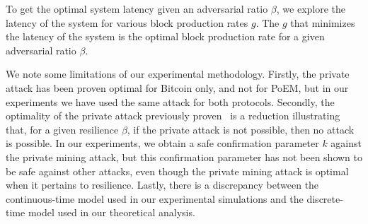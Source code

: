 To get the optimal system latency given an adversarial ratio $\beta$, we explore the latency of the system for various block production rates $g$.
The $g$ that minimizes the latency of the system is the optimal block production rate for a given adversarial ratio $\beta$.




%
%

We note some limitations of our experimental methodology. Firstly, the private attack has been proven optimal
for Bitcoin only, and not for PoEM, but in our experiments we have used the same attack for both protocols.
Secondly, the optimality of the private attack previously proven~\cite{eiar} is a reduction illustrating
that, for a given resilience $\beta$, if the private attack is not possible, then no attack is possible.
In our experiments, we obtain a safe confirmation parameter $k$ against the private mining attack,
but this confirmation parameter has not been shown to be safe against other attacks, even though the private
mining attack is optimal when it pertains to resilience.
Lastly, there is a discrepancy between the continuous-time model used in our experimental simulations
and the discrete-time model used in our theoretical analysis.